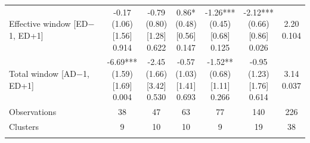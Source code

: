 \begin{threeparttable}
\begin{tabular}{@{}lcccccc}
Effective window [ED$-$1, ED+1] & \makecell{-0.17\\(1.06)\\{}[1.56]\\{0.914}} & \makecell{-0.79\\(0.80)\\{}[1.28]\\{0.622}} & \makecell{0.86*\\(0.48)\\{}[0.56]\\{0.147}} & \makecell{-1.26***\\(0.45)\\{}[0.68]\\{0.125}} & \makecell{-2.12***\\(0.66)\\{}[0.86]\\{0.026}} & \makecell{2.20\\{0.104}} \\
\addlinespace[0.25ex]
\addlinespace[0.25ex]
Total window [AD$-$1, ED+1] & \makecell{-6.69***\\(1.59)\\{}[1.69]\\{0.004}} & \makecell{-2.45\\(1.66)\\{}[3.42]\\{0.530}} & \makecell{-0.57\\(1.03)\\{}[1.41]\\{0.693}} & \makecell{-1.52**\\(0.68)\\{}[1.11]\\{0.266}} & \makecell{-0.95\\(1.23)\\{}[1.76]\\{0.614}} & \makecell{3.14\\{0.037}} \\
\addlinespace[0.25ex]
\addlinespace[0.25ex]
Observations & 38 & 47 & 63 & 77 & 140 & 226 \\
\addlinespace[0.25ex]
\addlinespace[0.25ex]
Clusters & 9 & 10 & 10 & 9 & 19 & 38 \\
\addlinespace[0.25ex]
\bottomrule
\end{tabular}
\endgroup
\noindent\begin{minipage}{\linewidth}\smallskip\footnotesize

\end{minipage}
\end{threeparttable}
